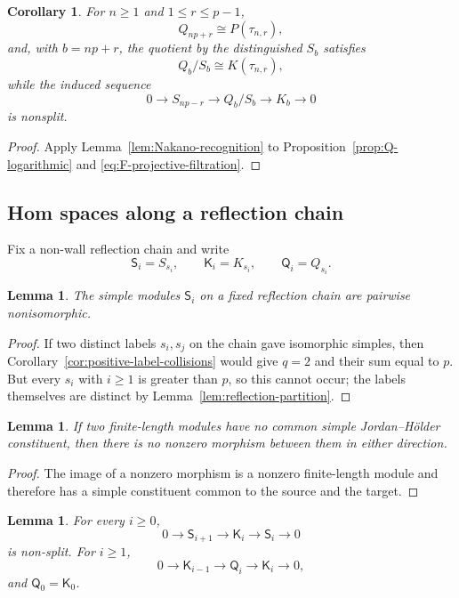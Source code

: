 \documentclass[12pt,leqno]{amsart}
\numberwithin{equation}{section}
\newtheorem{lem}[thm]{Lemma}
\newtheorem{cor}[thm]{Corollary}
\begin{document}
\begin{cor}\label{cor:Q-Ptau}
For $n\geq1$ and $1\leq r\leq p-1$,
\[
 Q_{np+r}\cong P(\tau_{n,r}),
\]
and, with $b=np+r$, the quotient by the distinguished $S_b$ satisfies
\[
 Q_b/S_b\cong K(\tau_{n,r}),
\]
while the induced sequence
\[
 0\longrightarrow S_{np-r}\longrightarrow Q_b/S_b
 \longrightarrow K_b\longrightarrow0
\]
is nonsplit.
\end{cor}

\begin{proof}
Apply Lemma~\ref{lem:Nakano-recognition} to
Proposition~\ref{prop:Q-logarithmic} and
\eqref{eq:F-projective-filtration}.
\end{proof}

\subsection{Hom spaces along a reflection chain}

Fix a non-wall reflection chain and write
\[
 \mathsf S_i=S_{s_i},\qquad
 \mathsf K_i=K_{s_i},\qquad
 \mathsf Q_i=Q_{s_i}.
\]

\begin{lem}\label{lem:chain-simple-distinct}
The simple modules $\mathsf S_i$ on a fixed reflection chain are pairwise
nonisomorphic.
\end{lem}

\begin{proof}
If two distinct labels $s_i,s_j$ on the chain gave isomorphic simples,
then
Corollary~\ref{cor:positive-label-collisions} would give $q=2$ and their
sum equal to $p$.  But every $s_i$ with $i\ge1$ is greater than $p$, so
this cannot occur; the labels themselves are distinct by
Lemma~\ref{lem:reflection-partition}.
\end{proof}

\begin{lem}\label{lem:disjoint-constituents}
If two finite-length modules have no common simple Jordan--H\"older
constituent, then there is no nonzero morphism between them in either
direction.
\end{lem}

\begin{proof}
The image of a nonzero morphism is a nonzero finite-length module and
therefore has a simple constituent common to the source and the target.
\end{proof}

\begin{lem}\label{lem:chain-filtrations}
For every $i\geq0$,
\begin{equation}\label{eq:A-chain}
 0\longrightarrow\mathsf S_{i+1}\longrightarrow\mathsf K_i
 \longrightarrow\mathsf S_i\longrightarrow0
\end{equation}
is non-split.  For $i\geq1$,
\begin{equation}\label{eq:Q-chain}
 0\longrightarrow\mathsf K_{i-1}\longrightarrow\mathsf Q_i
 \longrightarrow\mathsf K_i\longrightarrow0,
\end{equation}
and $\mathsf Q_0=\mathsf K_0$.
\end{lem}
\end{document}
